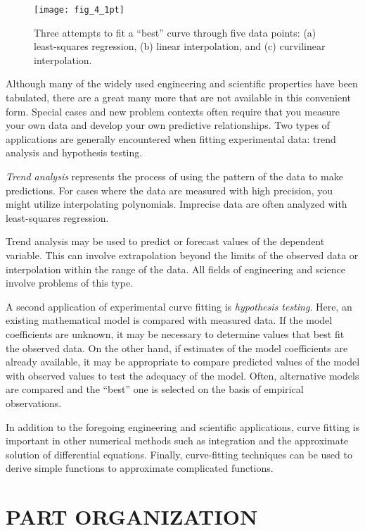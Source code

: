 \documentclass[../main.tex]{subfiles}
\begin{document}
\begin{figure}[H]
	\centering
	\texttt{[image: fig\_4\_1pt]}
	\caption{\textsf{Three attempts to fit a ``best'' curve through five data points: (a) least-squares regression, (b) linear
	interpolation, and (c) curvilinear interpolation.}}
	\label{fig:fig_4_1pt}
\end{figure}

Although many of the widely used engineering and scientific properties have been tabulated, there are a great many more that are not available in this convenient form. Special
cases and new problem contexts often require that you measure your own data and develop
your own predictive relationships. Two types of applications are generally encountered
when fitting experimental data: trend analysis and hypothesis testing.

\textit{Trend analysis} represents the process of using the pattern of the data to make predictions. For cases where the data are measured with high precision, you might utilize interpolating polynomials. Imprecise data are often analyzed with least-squares regression.

Trend analysis may be used to predict or forecast values of the dependent variable. This
can involve extrapolation beyond the limits of the observed data or interpolation within the
range of the data. All fields of engineering and science involve problems of this type.

A second application of experimental curve fitting is \textit{hypothesis testing}. Here, an
existing mathematical model is compared with measured data. If the model coefficients are unknown, it may be necessary to determine values that best fit the observed data. On the
other hand, if estimates of the model coefficients are already available, it may be appropriate to compare predicted values of the model with observed values to test the adequacy of
the model. Often, alternative models are compared and the ``best'' one is selected on the
basis of empirical observations.

In addition to the foregoing engineering and scientific applications, curve fitting is important in other numerical methods such as integration and the approximate solution of differential equations. Finally, curve-fitting techniques can be used to derive simple functions
to approximate complicated functions.

\section{PART ORGANIZATION}
\end{document}
